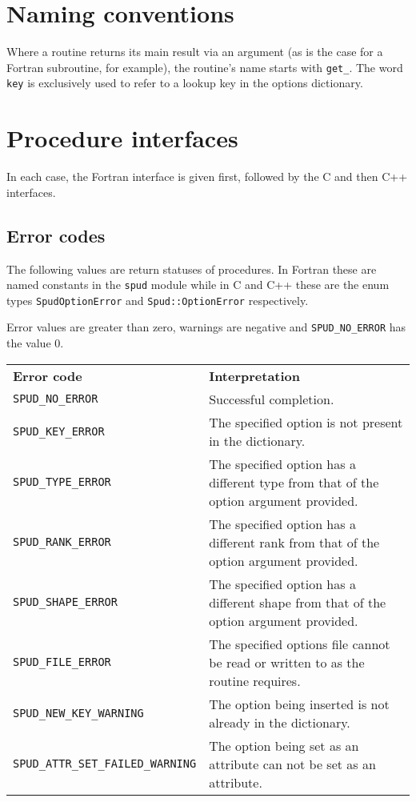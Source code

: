 \documentclass[a4paper, 11pt]{book}
\begin{document}
\section{Naming conventions}

Where a routine returns its main result via an argument (as is the case for
a Fortran subroutine, for example), the routine's name starts with
\lstinline[language=fortran]+get_+. The word
\lstinline[language=fortran]+key+ is exclusively used to refer to a lookup key in
the options dictionary.

\section{Procedure interfaces}
\lstset{frame=single}

In each case, the Fortran interface is given first, followed by the C and
then C++ interfaces.

\subsection{Error codes}\label{sec:error_codes}

The following values are return statuses of procedures. In Fortran these are
named constants in the \lstinline+spud+ module while in C and C++ these are
the enum types \lstinline+SpudOptionError+ and \lstinline+Spud::OptionError+
respectively.

Error values are greater than zero, warnings are negative and
\lstinline+SPUD_NO_ERROR+ has the value 0.

\begin{tabular}{lp{8cm}}
  \textbf{Error code} & \textbf{Interpretation}\\
  \lstinline+SPUD_NO_ERROR+ & Successful completion.\\
  \lstinline+SPUD_KEY_ERROR+ & The specified option is not present in the
  dictionary.\\
  \lstinline+SPUD_TYPE_ERROR+ & The specified option has a different type
  from that of the option argument provided.\\
  \lstinline+SPUD_RANK_ERROR+ & The specified option has a different rank
  from that of the option argument provided.\\
  \lstinline+SPUD_SHAPE_ERROR+ & The specified option has a different shape
  from that of the option argument provided.\\
  \lstinline+SPUD_FILE_ERROR+ & The specified options file cannot be read or
  written to as the routine requires.\\
  \lstinline+SPUD_NEW_KEY_WARNING+ & The option being inserted is not
  already in the dictionary.\\
  \lstinline+SPUD_ATTR_SET_FAILED_WARNING+ & The option being set as an
  attribute can not be set as an attribute.
\end{tabular}
\end{document}
